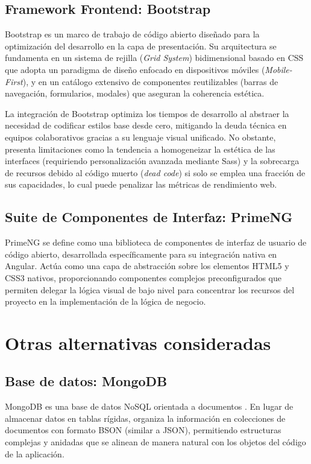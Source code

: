 \subsection{Framework Frontend: Bootstrap}
Bootstrap es un marco de trabajo de código abierto diseñado para la optimización del desarrollo en la capa de presentación. Su arquitectura se fundamenta en un sistema de rejilla (\textit{Grid System}) bidimensional basado en CSS que adopta un paradigma de diseño enfocado en dispositivos móviles (\textit{Mobile-First}), y en un catálogo extensivo de componentes reutilizables (barras de navegación, formularios, modales) que aseguran la coherencia estética.

La integración de Bootstrap optimiza los tiempos de desarrollo al abstraer la necesidad de codificar estilos base desde cero, mitigando la deuda técnica en equipos colaborativos gracias a su lenguaje visual unificado. No obstante, presenta limitaciones como la tendencia a homogeneizar la estética de las interfaces (requiriendo personalización avanzada mediante Sass) y la sobrecarga de recursos debido al código muerto (\textit{dead code}) si solo se emplea una fracción de sus capacidades, lo cual puede penalizar las métricas de rendimiento web.

\subsection{Suite de Componentes de Interfaz: PrimeNG}
PrimeNG se define como una biblioteca de componentes de interfaz de usuario de código abierto, desarrollada específicamente para su integración nativa en Angular. Actúa como una capa de abstracción sobre los elementos HTML5 y CSS3 nativos, proporcionando componentes complejos preconfigurados que permiten delegar la lógica visual de bajo nivel para concentrar los recursos del proyecto en la implementación de la lógica de negocio.


\section{Otras alternativas consideradas}

\subsection{Base de datos: MongoDB}
MongoDB es una base de datos NoSQL orientada a documentos \cite{MongoDBDocs}. En lugar de almacenar datos en tablas rígidas, organiza la información en colecciones de documentos con formato BSON (similar a JSON), permitiendo estructuras complejas y anidadas que se alinean de manera natural con los objetos del código de la aplicación.

